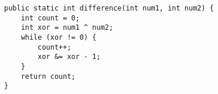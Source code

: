 \begin{verbatim}
public static int difference(int num1, int num2) {
	int count = 0;
	int xor = num1 ^ num2;
	while (xor != 0) {
		count++;
		xor &= xor - 1;
	}
	return count;
}
\end{verbatim}